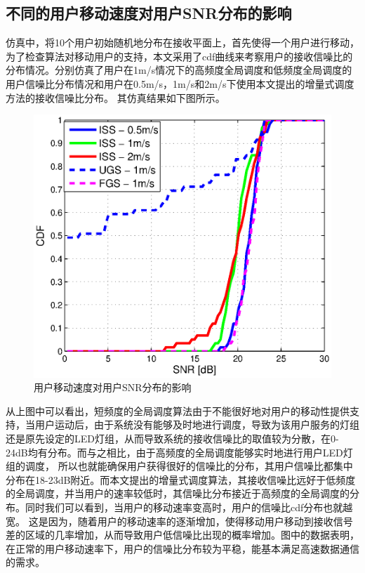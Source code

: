\subsection{不同的用户移动速度对用户SNR分布的影响}
仿真中，将10个用户初始随机地分布在接收平面上，首先使得一个用户进行移动，为了检查算法对移动用户的支持，本文采用了cdf曲线来考察用户的接收信噪比的分布情况。分别仿真了用户在1m/s情况下的高频度全局调度和低频度全局调度的用户信噪比分布情况和用户在0.5m/s，1m/s和2m/s下使用本文提出的增量式调度方法的接收信噪比分布。
其仿真结果如下图所示。

\begin{figure}[htbp]
    \centering
	\includegraphics[width=\textwidth]{figures/chapter-5/Speed2Snr.eps}
	\caption{用户移动速度对用户SNR分布的影响}
	\label{fig:speed-2-snr}
\end{figure}

从上图中可以看出，短频度的全局调度算法由于不能很好地对用户的移动性提供支持，当用户运动后，由于系统没有能够及时地进行调度，导致为该用户服务的灯组还是原先设定的LED灯组，从而导致系统的接收信噪比的取值较为分散，在0-24dB均有分布。而与之相比，由于高频度的全局调度能够实时地进行用户LED灯组的调度，
所以也就能确保用户获得很好的信噪比的分布，其用户信噪比都集中分布在18-23dB附近。而本文提出的增量式调度算法，其接收信噪比远好于低频度的全局调度，并当用户的速率较低时，其信噪比分布接近于高频度的全局调度的分布。同时我们可以看到，当用户的移动速率变高时，用户的信噪比cdf分布也就越宽。
这是因为，随着用户的移动速率的逐渐增加，使得移动用户移动到接收信号差的区域的几率增加，从而导致用户低信噪比出现的概率增加。图中的数据表明，在正常的用户移动速率下，用户的信噪比分布较为平稳，能基本满足高速数据通信的需求。

